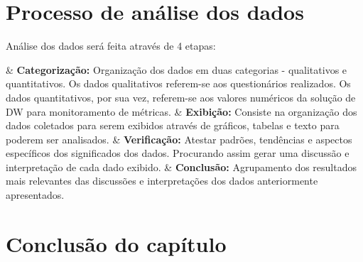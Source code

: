 \section{Processo de análise dos dados}

Análise dos dados será feita através de 4 etapas:

\begin{easylist}[itemize]	
	
	& \textbf{Categorização: } Organização dos dados em duas categorias - qualitativos e quantitativos. Os 		dados qualitativos referem-se aos questionários realizados. Os dados quantitativos, por sua vez, 			referem-se aos valores numéricos da solução de DW para monitoramento de métricas. 
	& \textbf{Exibição: } Consiste na organização dos dados coletados para serem exibidos através de 				gráficos, tabelas e texto para poderem ser analisados. 
	& \textbf{Verificação: } Atestar padrões, tendências e aspectos específicos dos significados dos 				dados. Procurando assim gerar uma discussão e interpretação de cada dado exibido.
	& \textbf{Conclusão: } Agrupamento dos resultados mais relevantes das discussões e interpretações dos 			dados anteriormente apresentados.
	
	\end{easylist}	


\section{Conclusão do capítulo}

\label{estudo de caso}

